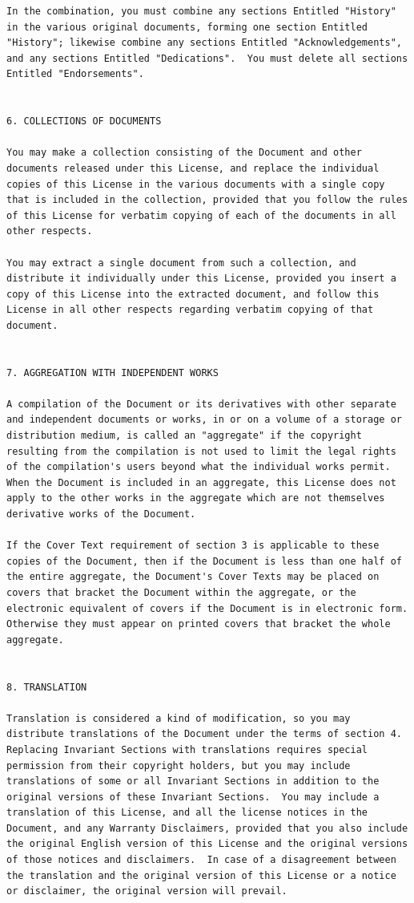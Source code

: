 \documentclass[a4paper]{report}
\begin{document}
\begin{verbatim}
In the combination, you must combine any sections Entitled "History"
in the various original documents, forming one section Entitled
"History"; likewise combine any sections Entitled "Acknowledgements",
and any sections Entitled "Dedications".  You must delete all sections
Entitled "Endorsements".


6. COLLECTIONS OF DOCUMENTS

You may make a collection consisting of the Document and other
documents released under this License, and replace the individual
copies of this License in the various documents with a single copy
that is included in the collection, provided that you follow the rules
of this License for verbatim copying of each of the documents in all
other respects.

You may extract a single document from such a collection, and
distribute it individually under this License, provided you insert a
copy of this License into the extracted document, and follow this
License in all other respects regarding verbatim copying of that
document.


7. AGGREGATION WITH INDEPENDENT WORKS

A compilation of the Document or its derivatives with other separate
and independent documents or works, in or on a volume of a storage or
distribution medium, is called an "aggregate" if the copyright
resulting from the compilation is not used to limit the legal rights
of the compilation's users beyond what the individual works permit.
When the Document is included in an aggregate, this License does not
apply to the other works in the aggregate which are not themselves
derivative works of the Document.

If the Cover Text requirement of section 3 is applicable to these
copies of the Document, then if the Document is less than one half of
the entire aggregate, the Document's Cover Texts may be placed on
covers that bracket the Document within the aggregate, or the
electronic equivalent of covers if the Document is in electronic form.
Otherwise they must appear on printed covers that bracket the whole
aggregate.


8. TRANSLATION

Translation is considered a kind of modification, so you may
distribute translations of the Document under the terms of section 4.
Replacing Invariant Sections with translations requires special
permission from their copyright holders, but you may include
translations of some or all Invariant Sections in addition to the
original versions of these Invariant Sections.  You may include a
translation of this License, and all the license notices in the
Document, and any Warranty Disclaimers, provided that you also include
the original English version of this License and the original versions
of those notices and disclaimers.  In case of a disagreement between
the translation and the original version of this License or a notice
or disclaimer, the original version will prevail.


\end{verbatim}
\end{document}
